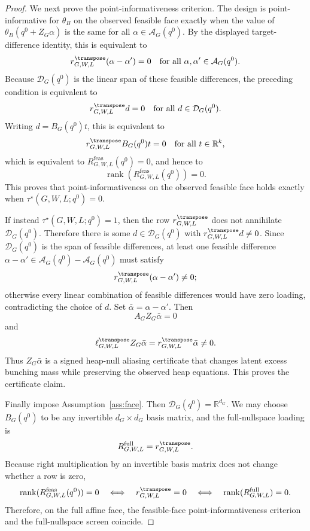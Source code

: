 \begin{proof}
We next prove the point-informativeness criterion.  The design is point-informative for \(\theta_B\) on the observed feasible face exactly when the value of \(\theta_B(q^0+Z_G\alpha)\) is the same for all \(\alpha\in\mathcal{A}_G(q^0)\).  By the displayed target-difference identity, this is equivalent to
\[
r_{G,W,L}^{\transpose}(\alpha-\alpha')=0
\quad\text{for all }\alpha,\alpha'\in\mathcal{A}_G(q^0).
\]
Because \(\mathcal{D}_G(q^0)\) is the linear span of these feasible differences, the preceding condition is equivalent to
\[
r_{G,W,L}^{\transpose}d=0
\quad\text{for all }d\in\mathcal{D}_G(q^0).
\]
Writing \(d=B_G(q^0)t\), this is equivalent to
\[
r_{G,W,L}^{\transpose}B_G(q^0)t=0
\quad\text{for all }t\in\mathbb{R}^k,
\]
which is equivalent to \(R^{\mathrm{feas}}_{G,W,L}(q^0)=0\), and hence to
\[
\operatorname{rank}(R^{\mathrm{feas}}_{G,W,L}(q^0))=0.
\]
This proves that point-informativeness on the observed feasible face holds exactly when \(\tau^\star(G,W,L;q^0)=0\).

If instead \(\tau^\star(G,W,L;q^0)=1\), then the row \(r_{G,W,L}^{\transpose}\) does not annihilate \(\mathcal{D}_G(q^0)\).  Therefore there is some \(d\in\mathcal{D}_G(q^0)\) with \(r_{G,W,L}^{\transpose}d\ne0\).  Since \(\mathcal{D}_G(q^0)\) is the span of feasible differences, at least one feasible difference \(\alpha-\alpha'\in\mathcal{A}_G(q^0)-\mathcal{A}_G(q^0)\) must satisfy
\[
r_{G,W,L}^{\transpose}(\alpha-\alpha')\ne0;
\]
otherwise every linear combination of feasible differences would have zero loading, contradicting the choice of \(d\).  Set \(\bar\alpha=\alpha-\alpha'\).  Then
\[
A_GZ_G\bar\alpha=0
\]
and
\[
\ell_{G,W,L}^{\transpose}Z_G\bar\alpha
=r_{G,W,L}^{\transpose}\bar\alpha\ne0.
\]
Thus \(Z_G\bar\alpha\) is a signed heap-null aliasing certificate that changes latent excess bunching mass while preserving the observed heap equations.  This proves the certificate claim.

Finally impose Assumption~\ref{ass:face}.  Then \(\mathcal{D}_G(q^0)=\mathbb{R}^{d_G}\).  We may choose \(B_G(q^0)\) to be any invertible \(d_G\times d_G\) basis matrix, and the full-nullspace loading is
\[
R^{\mathrm{full}}_{G,W,L}=r_{G,W,L}^{\transpose}.
\]
Because right multiplication by an invertible basis matrix does not change whether a row is zero,
\[
\operatorname{rank}(R^{\mathrm{feas}}_{G,W,L}(q^0))=0
\quad\Longleftrightarrow\quad
r_{G,W,L}^{\transpose}=0
\quad\Longleftrightarrow\quad
\operatorname{rank}(R^{\mathrm{full}}_{G,W,L})=0.
\]
Therefore, on the full affine face, the feasible-face point-informativeness criterion and the full-nullspace screen coincide.
\end{proof}

